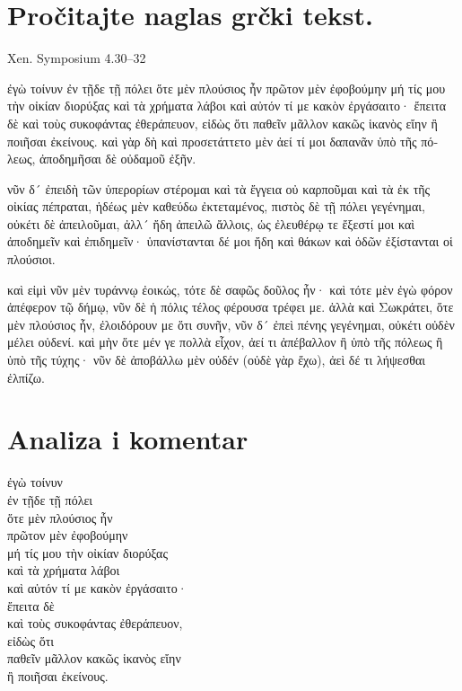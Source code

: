 
\section*{Pročitajte naglas grčki tekst.}

Xen. Symposium 4.30–32


\medskip


{\large

\begin{greek}

\noindent ἐγὼ τοίνυν ἐν τῇδε τῇ πόλει ὅτε μὲν πλούσιος ἦν πρῶτον μὲν ἐφοβούμην μή τίς μου τὴν οἰκίαν διορύξας καὶ τὰ χρήματα λάβοι καὶ αὐτόν τί με κακὸν ἐργάσαιτο· ἔπειτα δὲ καὶ τοὺς συκοφάντας ἐθεράπευον, εἰδὼς ὅτι παθεῖν μᾶλλον κακῶς ἱκανὸς εἴην ἢ ποιῆσαι ἐκείνους. καὶ γὰρ δὴ καὶ προσετάττετο μὲν ἀεί τί μοι δαπανᾶν ὑπὸ τῆς πόλεως, ἀποδημῆσαι δὲ οὐδαμοῦ ἐξῆν.

\noindent νῦν δ´ ἐπειδὴ τῶν ὑπερορίων στέρομαι καὶ τὰ ἔγγεια οὐ καρποῦμαι καὶ τὰ ἐκ τῆς οἰκίας πέπραται, ἡδέως μὲν καθεύδω ἐκτεταμένος, πιστὸς δὲ τῇ πόλει γεγένημαι, οὐκέτι δὲ ἀπειλοῦμαι, ἀλλ´ ἤδη ἀπειλῶ ἄλλοις, ὡς ἐλευθέρῳ τε ἔξεστί μοι καὶ ἀποδημεῖν καὶ ἐπιδημεῖν· ὑπανίστανται δέ μοι ἤδη καὶ θάκων καὶ ὁδῶν ἐξίστανται οἱ πλούσιοι.

\noindent καὶ εἰμὶ νῦν μὲν τυράννῳ ἐοικώς, τότε δὲ σαφῶς δοῦλος ἦν· καὶ τότε μὲν ἐγὼ φόρον ἀπέφερον τῷ δήμῳ, νῦν δὲ ἡ πόλις τέλος φέρουσα τρέφει με. ἀλλὰ καὶ Σωκράτει, ὅτε μὲν πλούσιος ἦν, ἐλοιδόρουν με ὅτι συνῆν, νῦν δ´ ἐπεὶ πένης γεγένημαι, οὐκέτι οὐδὲν μέλει οὐδενί. καὶ μὴν ὅτε μέν γε πολλὰ εἶχον, ἀεί τι ἀπέβαλλον ἢ ὑπὸ τῆς πόλεως ἢ ὑπὸ τῆς τύχης· νῦν δὲ ἀποβάλλω μὲν οὐδέν (οὐδὲ γὰρ ἔχω), ἀεὶ δέ τι λήψεσθαι ἐλπίζω. 

\end{greek}

}


\section*{Analiza i komentar}


{\large
\begin{greek}
\noindent ἐγὼ τοίνυν \\
\tabto{2em} ἐν τῇδε τῇ πόλει \\
\tabto{2em} ὅτε μὲν πλούσιος ἦν \\
πρῶτον μὲν ἐφοβούμην \\
\tabto{2em} μή τίς μου τὴν οἰκίαν διορύξας \\
\tabto{4em} καὶ τὰ χρήματα λάβοι \\
\tabto{4em} καὶ αὐτόν τί με κακὸν ἐργάσαιτο· \\
ἔπειτα δὲ  \\
καὶ τοὺς συκοφάντας ἐθεράπευον, \\
εἰδὼς ὅτι \\
\tabto{2em} παθεῖν μᾶλλον κακῶς ἱκανὸς εἴην \\
\tabto{2em} ἢ ποιῆσαι ἐκείνους. \\

\end{greek}
}

